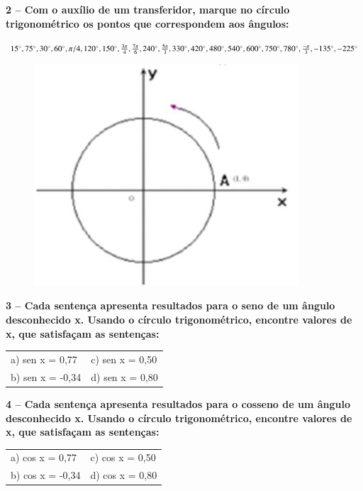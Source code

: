 \textbf{2 – Com o auxílio de um transferidor, marque no círculo trigonométrico os pontos que correspondem aos ângulos:}

$15^\circ, 75^\circ, 30^\circ, 60^\circ, \pi/4, 120^\circ, 150^\circ, \frac{3\pi}{4}, \frac{7\pi}{6}, 240^\circ, \frac{5\pi}{3}, 330^\circ, 420^\circ, 480^\circ, 540^\circ, 600^\circ, 750^\circ, 780^\circ,\\ \frac{-\pi}{3}, -135^\circ, -225^\circ$


\begin{figure}[htb]
	\centering
	\includegraphics{chapters/appendixLesson/Q2.jpg}
\end{figure}

\textbf{3 – Cada sentença apresenta resultados para o seno de um ângulo desconhecido x. Usando o círculo trigonométrico, encontre valores de x, que satisfaçam as sentenças:}

\begin{table}[htb]
	\begin{tabular}{ll}
	 	a) sen x = 0,77 & c) sen x = 0,50 \\
		b) sen x = -0,34 & d) sen x = 0,80
	\end{tabular}
\end{table}

\textbf{4 – Cada sentença apresenta resultados para o cosseno de um ângulo desconhecido x. Usando o círculo trigonométrico, encontre valores de x, que satisfaçam as sentenças:}

\begin{table}[htb]
	\begin{tabular}{ll}
		a) cos x = 0,77 & c) cos x = 0,50 \\
		b) cos x = -0,34 & d) cos x = 0,80
	\end{tabular}
\end{table}


